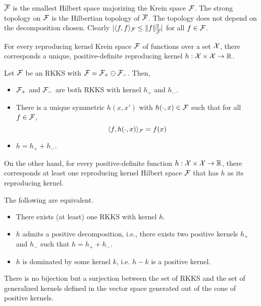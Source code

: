 $\overline{{\mathcal F}}$ is the smallest Hilbert space majorizing the Krein space ${\mathcal F}$.
The strong topology on ${\mathcal F}$ is the Hilbertian topology of $\overline{{\mathcal F}}$.
The topology does not depend on the decomposition chosen.
Clearly $|\langle f,f\rangle_{\mathcal F} \leq \lVert f\rVert^2_{\overline{{\mathcal F}}}|$ for all $f\in{\mathcal F}$.

For every reproducing kernel Krein space ${\mathcal F}$ of functions over a set ${\mathcal X}$, there corresponds a unique, positive-definite reproducing kernel $h:{\mathcal X}\times{\mathcal X}\to\mathbb{R}$.

\begin{lemma}
  Let ${\mathcal F}$ be an RKKS with ${\mathcal F} = {\mathcal F}_+ \ominus {\mathcal F}_-$.
  Then,
  \begin{itemize}
    \item ${\mathcal F}_+$ and ${\mathcal F}_-$ are both RKKS with kernel $h_+$ and $h_-$.
    \item There is a unique symmetric $h(x,x')$ with $h(\cdot,x)\in{\mathcal F}$ such that for all $f\in{\mathcal F}$, 
    \[
      \langle f,h(\cdot,x)\rangle_{\mathcal F} = f(x)
    \]
    \item $h = h_+ + h_-$.
  \end{itemize}
\end{lemma}

On the other hand, for every positive-definite function $h:{\mathcal X}\times{\mathcal X}\to\mathbb{R}$, there corresponds at least one reproducing kernel Hilbert space ${\mathcal F}$ that has $h$ as its reproducing kernel.

\begin{lemma}
  The following are equivalent.
  \begin{itemize}
    \item There exists (at least) one RKKS with kernel $h$.
    \item $h$ admits a positive decomposition, i.e., there exists two positive kernels $h_+$ and $h_-$ such that $h=h_++h_-$.
    \item $h$ is dominated by some kernel $k$, i.e. $h-k$ is a positive kernel.
  \end{itemize}
\end{lemma}

There is no bijection but a surjection between the set of RKKS and the set of generalized kernels defined in the vector space generated out of the cone of positive kernels.




















